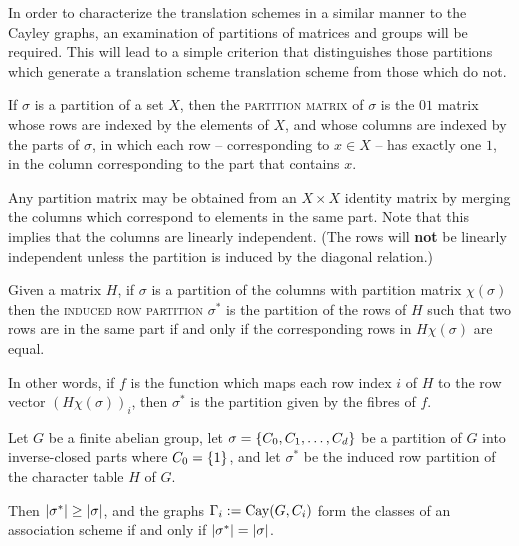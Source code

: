 \documentclass{report}
\begin{document}
    In order to characterize the translation schemes in a similar manner to the
    Cayley graphs, an examination of partitions of matrices and groups will be
    required.  This will lead to a simple criterion that distinguishes those
    partitions which generate a translation scheme translation scheme from those
    which do not.  \cite[Section~12.10]{godsil}

    \begin{defn}\label{partition-matrix}
      If $\sigma$ is a partition of a set $X$,
      then the \textsc{partition matrix} of $\sigma$
      is the $01$ matrix
      whose rows are indexed by the elements of $X$,
      and whose columns are indexed by the parts of $\sigma$,
      in which each row -- corresponding to $x \in X$ -- has exactly one $1$,
      in the column corresponding to the part that contains $x$.
    \end{defn}

    Any partition matrix may be obtained from an $X \times X$ identity matrix by
    merging the columns which correspond to elements in the same part.
    Note that this implies that the columns are linearly independent.
    (The rows will \textbf{not} be linearly independent unless the partition
    is induced by the diagonal relation.)

    \begin{defn}\label{induced-row-partition}
      Given a matrix $H$, if $\sigma$ is a partition of the columns with
      partition matrix $\chi(\sigma)$ then the \textsc{induced row partition}
      $\sigma^*$ is the partition of the rows of $H$ such that two rows are in the
      same part if and only if the corresponding rows in $H\chi(\sigma)$ are
      equal.
    \end{defn}

    In other words, if $f$ is the function which maps each row index
    $i$ of $H$ to the row vector $(H\chi(\sigma))_i$, then $\sigma^*$ is the
    partition given by the fibres of $f$.
    \cite[Section 12.7]{godsil}

    \begin{thm}
      \label{translation-char}
      Let $G$ be a finite abelian group,
      let $\sigma = \left\lbrace C_0, C_1, \ldots, C_d \right\rbrace$ be a partition of $G$
      into inverse-closed parts where $C_0 = \left\lbrace 1 \right\rbrace$, and
      let $\sigma^*$ be the induced row partition
      of the character table $H$ of $G$.

      Then $\left\lvert \sigma^* \right\rvert \geq \left\lvert \sigma \right\rvert$,
      and the graphs $\Gamma_i := \operatorname{Cay}(G, C_i)$ form the classes of an
      association scheme if and only if $\left\lvert \sigma^* \right\rvert = \left\lvert \sigma \right\rvert$.
    \end{thm}
\end{document}
